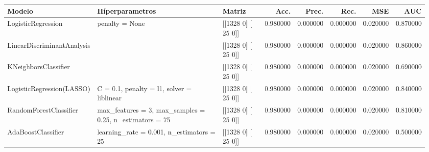 \begin{tabular}{lllrrrrr}
\toprule
Modelo & Híperparametros & Matriz & Acc. & Prec. & Rec. & MSE & AUC \\
\midrule
LogisticRegression & penalty = None & [[1328    0]
 [  25    0]] & 0.980000 & 0.000000 & 0.000000 & 0.020000 & 0.870000 \\
LinearDiscriminantAnalysis &  & [[1328    0]
 [  25    0]] & 0.980000 & 0.000000 & 0.000000 & 0.020000 & 0.860000 \\
KNeighborsClassifier &  & [[1328    0]
 [  25    0]] & 0.980000 & 0.000000 & 0.000000 & 0.020000 & 0.690000 \\
LogisticRegression(LASSO) & C = 0.1, penalty = l1, solver = liblinear & [[1328    0]
 [  25    0]] & 0.980000 & 0.000000 & 0.000000 & 0.020000 & 0.840000 \\
RandomForestClassifier & max_features = 3, max_samples = 0.25, n_estimators = 75 & [[1328    0]
 [  25    0]] & 0.980000 & 0.000000 & 0.000000 & 0.020000 & 0.810000 \\
AdaBoostClassifier & learning_rate = 0.001, n_estimators = 25 & [[1328    0]
 [  25    0]] & 0.980000 & 0.000000 & 0.000000 & 0.020000 & 0.500000 \\
\bottomrule
\end{tabular}
